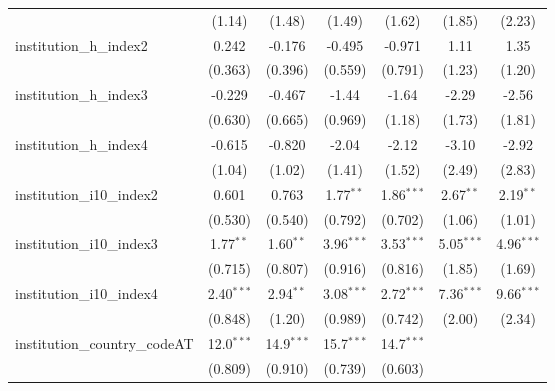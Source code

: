 \begin{tabular}{lcccccc}
                                         & (1.14)        & (1.48)        & (1.49)        & (1.62)        & (1.85)        & (2.23)\\   
   institution\_h\_index2                & 0.242         & -0.176        & -0.495        & -0.971        & 1.11          & 1.35\\   
                                         & (0.363)       & (0.396)       & (0.559)       & (0.791)       & (1.23)        & (1.20)\\   
   institution\_h\_index3                & -0.229        & -0.467        & -1.44         & -1.64         & -2.29         & -2.56\\   
                                         & (0.630)       & (0.665)       & (0.969)       & (1.18)        & (1.73)        & (1.81)\\   
   institution\_h\_index4                & -0.615        & -0.820        & -2.04         & -2.12         & -3.10         & -2.92\\   
                                         & (1.04)        & (1.02)        & (1.41)        & (1.52)        & (2.49)        & (2.83)\\   
   institution\_i10\_index2              & 0.601         & 0.763         & 1.77$^{**}$   & 1.86$^{***}$  & 2.67$^{**}$   & 2.19$^{**}$\\   
                                         & (0.530)       & (0.540)       & (0.792)       & (0.702)       & (1.06)        & (1.01)\\   
   institution\_i10\_index3              & 1.77$^{**}$   & 1.60$^{**}$   & 3.96$^{***}$  & 3.53$^{***}$  & 5.05$^{***}$  & 4.96$^{***}$\\   
                                         & (0.715)       & (0.807)       & (0.916)       & (0.816)       & (1.85)        & (1.69)\\   
   institution\_i10\_index4              & 2.40$^{***}$  & 2.94$^{**}$   & 3.08$^{***}$  & 2.72$^{***}$  & 7.36$^{***}$  & 9.66$^{***}$\\   
                                         & (0.848)       & (1.20)        & (0.989)       & (0.742)       & (2.00)        & (2.34)\\   
   institution\_country\_codeAT          & 12.0$^{***}$  & 14.9$^{***}$  & 15.7$^{***}$  & 14.7$^{***}$  &               &   \\   
                                         & (0.809)       & (0.910)       & (0.739)       & (0.603)       &               &   \\   

\end{tabular}
